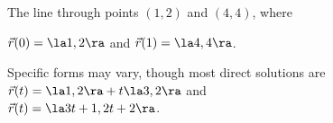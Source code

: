 {The line through points $(1,2)$ and $(4,4)$, where 

$\vec r(0) = \la 1,2\ra$ and $\vec r(1) = \la 4,4\ra$.
}
{Specific forms may vary, though most direct solutions are \\
$\vec r(t) = \la 1,2\ra +t\la 3,2\ra$ and \\
$\vec r(t) = \la 3t+1, 2t+2\ra$.
}
